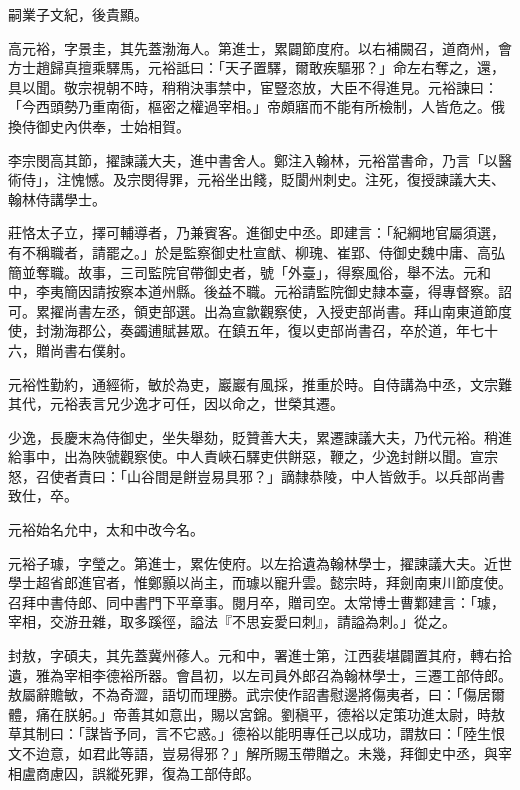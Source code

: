 \begin{pinyinscope}
 嗣業子文紀，後貴顯。



 高元裕，字景圭，其先蓋渤海人。第進士，累闢節度府。以右補闕召，道商州，會方士趙歸真擅乘驛馬，元裕詆曰：「天子置驛，爾敢疾驅邪？」命左右奪之，還，具以聞。敬宗視朝不時，稍稍決事禁中，宦豎恣放，大臣不得進見。元裕諫曰：「今西頭勢乃重南衙，樞密之權過宰相。」帝頗寤而不能有所檢制，人皆危之。俄換侍御史內供奉，士始相賀。



 李宗閔高其節，擢諫議大夫，進中書舍人。鄭注入翰林，元裕當書命，乃言「以醫術侍」，注愧憾。及宗閔得罪，元裕坐出餞，貶閬州刺史。注死，復授諫議大夫、翰林侍講學士。



 莊恪太子立，擇可輔導者，乃兼賓客。進御史中丞。即建言：「紀綱地官屬須選，有不稱職者，請罷之。」於是監察御史杜宣猷、柳瑰、崔郢、侍御史魏中庸、高弘簡並奪職。故事，三司監院官帶御史者，號「外臺」，得察風俗，舉不法。元和中，李夷簡因請按察本道州縣。後益不職。元裕請監院御史隸本臺，得專督察。詔可。累擢尚書左丞，領吏部選。出為宣歙觀察使，入授吏部尚書。拜山南東道節度使，封渤海郡公，奏蠲逋賦甚眾。在鎮五年，復以吏部尚書召，卒於道，年七十六，贈尚書右僕射。



 元裕性勤約，通經術，敏於為吏，巖巖有風採，推重於時。自侍講為中丞，文宗難其代，元裕表言兄少逸才可任，因以命之，世榮其遷。



 少逸，長慶末為侍御史，坐失舉劾，貶贊善大夫，累遷諫議大夫，乃代元裕。稍進給事中，出為陜虢觀察使。中人責峽石驛吏供餅惡，鞭之，少逸封餅以聞。宣宗怒，召使者責曰：「山谷間是餅豈易具邪？」謫隸恭陵，中人皆斂手。以兵部尚書致仕，卒。



 元裕始名允中，太和中改今名。



 元裕子璩，字瑩之。第進士，累佐使府。以左拾遺為翰林學士，擢諫議大夫。近世學士超省郎進官者，惟鄭顥以尚主，而璩以寵升雲。懿宗時，拜劍南東川節度使。召拜中書侍郎、同中書門下平章事。閱月卒，贈司空。太常博士曹鄴建言：「璩，宰相，交游丑雜，取多蹊徑，謚法『不思妄愛曰刺』，請謚為刺。」從之。



 封敖，字碩夫，其先蓋冀州蓚人。元和中，署進士第，江西裴堪闢置其府，轉右拾遺，雅為宰相李德裕所器。會昌初，以左司員外郎召為翰林學士，三遷工部侍郎。敖屬辭贍敏，不為奇澀，語切而理勝。武宗使作詔書慰邊將傷夷者，曰：「傷居爾體，痛在朕躬。」帝善其如意出，賜以宮錦。劉稹平，德裕以定策功進太尉，時敖草其制曰：「謀皆予同，言不它惑。」德裕以能明專任己以成功，謂敖曰：「陸生恨文不迨意，如君此等語，豈易得邪？」解所賜玉帶贈之。未幾，拜御史中丞，與宰相盧商慮囚，誤縱死罪，復為工部侍郎。




\end{pinyinscope}

